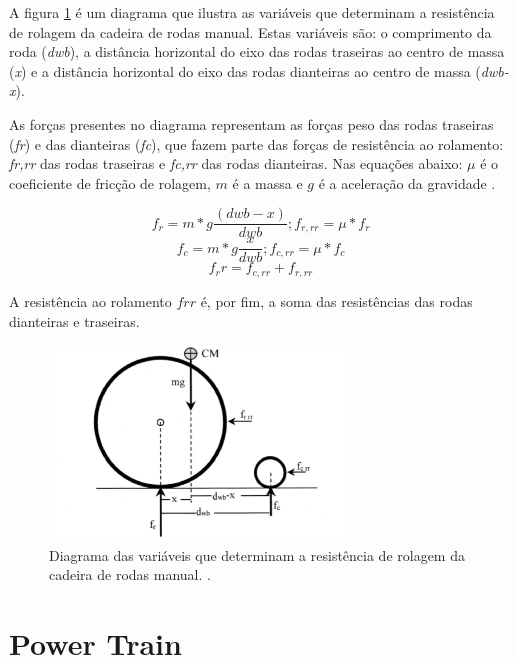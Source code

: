 	A figura \ref{fig:diagrama_variaveis} é um diagrama que ilustra as variáveis que determinam a resistência de rolagem da cadeira de rodas manual. Estas variáveis são: o comprimento da roda (\textit{dwb}), a distância horizontal do eixo das rodas traseiras ao centro de massa (\textit{x}) e a distância horizontal do eixo das rodas dianteiras ao centro de massa (\textit{dwb-x}).

	As forças presentes no diagrama representam as forças peso das rodas traseiras (\textit{fr}) e das dianteiras (\textit{fc}), que fazem parte das forças de resistência ao rolamento: \textit{fr,rr} das rodas traseiras e \textit{fc,rr} das rodas dianteiras. Nas equações abaixo: $\mu$ é o coeficiente de fricção de rolagem, $m$ é a massa e $g$ é a aceleração da gravidade \cite{propulsao_cadeira}.

	\begin{equation}
		f_r=m*g\frac{(dwb-x)}{dwb} ; f_{r,rr}=\mu*f_r
	\end{equation}
	\begin{equation}
		f_c=m*g\frac{x}{dwb} ; f_{c,rr}=\mu*f_c
	\end{equation}
	\begin{equation}
	f_rr=f_{c,rr}+ f_{r,rr}
	\end{equation}

	A resistência ao rolamento $frr$ é, por fim, a soma das resistências das rodas dianteiras e traseiras.

	\begin{figure}[!h]
		\centering
		\includegraphics[width = 0.7\textwidth]{figuras/resultados/diagrama_variaveis}
		\caption{Diagrama das variáveis que determinam a resistência de rolagem da cadeira de rodas manual. \cite{propulsao_cadeira}.}
		\label{fig:diagrama_variaveis}
	\end{figure}


\section{Power Train}

